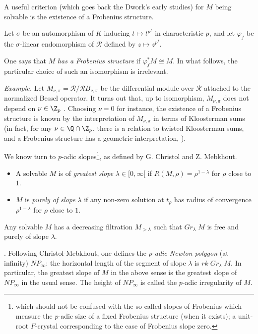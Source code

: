 \begin{para}\label{para::3.2.3} A useful criterion (which goes back the
 Dwork's early studies) for $M$ being solvable is the existence 
 of a Frobenius structure. 

 Let $\sigma$ be an automorphism of $K$ inducing $t\mapsto
 t^{p^f}$ in characteristic $p$, and let $\varphi_f$ be the
 $\sigma$-linear endomorphism of $\mathcal{R}$ defined by $z\mapsto
 z^{p^f}$.

 One says that $M$ {\it has a Frobenius structure} if $\varphi_f^\ast
 M\cong M $. In what follows, the particular choice of such an
 isomorphism is irrelevant.

 \medskip\noindent
 {\it Example.} Let
 $M_{\nu,\pi}=\mathcal{R}/\mathcal{R}B_{\nu,\pi}$ be the differential
 module over $\mathcal{R}$ attached 
 to the normalized Bessel operator. It turns out that, up to isomorphism,
 $M_{\nu,\pi}$ does not depend on $\nu\in \Z_p$ 
 \cite{andre:_repres_bessel}. Choosing $\nu=0$ for instance, the existence of a
 Frobenius structure is known by the interpretation of $M_{\nu,\pi}$ in 
 terms of Kloosterman sums \cite{bfapfota} (in fact, for any $\nu \in \Q\cap
 \Z_p$, there is a relation to twisted Kloosterman sums, and a Frobenius
 structure has a geometric interpretation, \cf \cite{berthelot84:_cohom_dwork}).
\end{para}

\begin{para}\label{para::3.2.4} We know turn to $p$-adic slopes\footnote{which
 should not be confused with the so-called slopes of Frobenius which
 measure the $p$-adic size of a fixed Frobenius structure (when it
 exists); a unit-root $F$-crystal corresponding to the case of Frobenius
 slope zero.}, as defined by G. Christol and Z. Mebkhout.

\begin{itemize}
 \item A solvable $M$ is of {\it greatest slope} $\lambda \in
       [0,\infty[$ if $R(M,\rho) = \rho^{1-\lambda}$ for $\rho $
       close to $1$.
 \item $M$ is {\it purely of slope} $\lambda$ if any non-zero 
       solution at $t_\rho$ has radius of convergence $\rho^{1-\lambda}$ for
       $\rho $ close to $1$.
\end{itemize}
\end{para}

\begin{thm}\label{thm::3.2.5} Any solvable $M$ has a decreasing
 filtration $M_{>\lambda}$ such that $Gr_\lambda\; M$ is free and 
 purely of slope $\lambda$.  
\end{thm}
\par \noindent \cf \cite{sltdldedp3}. Following Christol-Mebkhout, one
defines the {\it $p$-adic Newton polygon} 
(at infinity) $NP_\infty$: the horizontal length of the segment of slope
$\lambda$ is  $rk \;Gr_\lambda\; M $.  In particular, the greatest slope
of $M$ in the above sense is the greatest slope of $NP_\infty$ in the
usual sense. The height of $NP_\infty$ is called the $p$-adic
irregularity of $M$. 


